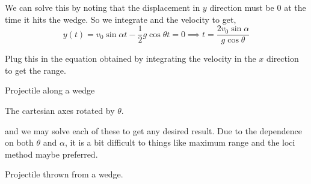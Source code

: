 \begin{exc}
\begin{solution}
        We can solve this by noting that the displacement in \(y\) direction must be \(0\) at the time 
        it hits the wedge. So we integrate and the velocity to get, 
            \begin{equation*}
                y(t) = v_0\sin\alpha t - \frac{1}{2}g\cos\theta t = 0 \implies t = \frac{2v_0\sin\alpha}{g\cos\theta} 
            \end{equation*}
        
        Plug this in the equation obtained by integrating the velocity in the \(x\) direction to get the range.
    \end{solution}
\end{exc}

\begin{marginfigure}
    \vspace{-8em}
    \centering
    \caption{Projectile along a wedge}
    \label{fig: projectilealongwedge}
\end{marginfigure}


\begin{marginfigure}
    \centering
    \caption{The cartesian axes rotated by \(\theta\).}
    \label{fig: projectilerotatedaxes}
\end{marginfigure}

and we may solve each of these to get any desired result. Due to the dependence 
on both \(\theta\) and \(\alpha\), it is a bit difficult to things like maximum range
and the loci method maybe preferred.  

\begin{marginfigure}
    \vspace{2em}
    \centering
    \caption{Projectile thrown from a wedge.}
    \label{fig: projectile wedge example}
\end{marginfigure}

